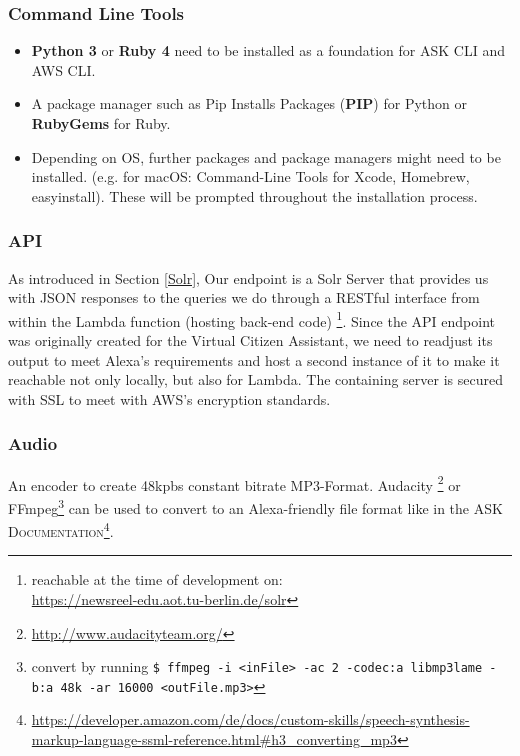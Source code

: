 \subsubsection*{Command Line Tools}
\begin{itemize}
\itemsep0em
\item \textbf{Python 3} or\textbf{ Ruby 4} need to be installed as a foundation for ASK CLI and AWS CLI.
\item  A package manager such as Pip Installs Packages (\textbf{PIP}) for Python or \textbf{RubyGems} for Ruby.
\item  Depending on OS, further packages and package managers might need to be installed. (e.g. for macOS: Command-Line Tools for Xcode, Homebrew, easyinstall). These will be prompted throughout the installation process.

\end{itemize}

	
\subsubsection*{API} 
As introduced in Section \ref{Solr}, Our endpoint is a Solr Server that provides us with JSON responses to the queries we do through a RESTful interface from within the Lambda function (hosting back-end code) \footnote{reachable at the time of development on:\\\url{https://newsreel-edu.aot.tu-berlin.de/solr}}. Since the API endpoint was originally created for the Virtual Citizen Assistant, we need to readjust its output to meet Alexa's requirements and host a second instance of it to make it reachable not only locally, but also for Lambda. The containing server is secured with SSL to meet with AWS's encryption standards.

%
%




	
\subsubsection*{Audio} An encoder to create 48kpbs constant bitrate MP3-Format. Audacity \footnote{\url{http://www.audacityteam.org/}} or FFmpeg\footnote{convert by running \lstinline|$ ffmpeg -i <inFile> -ac 2 -codec:a libmp3lame -b:a 48k -ar 16000 <outFile.mp3>|} can be used to convert to an Alexa-friendly file format like in the \textsc{ASK Documentation}\footnote{\url{https://developer.amazon.com/de/docs/custom-skills/speech-synthesis-markup-language-ssml-reference.html\#h3_converting_mp3}}.
	


